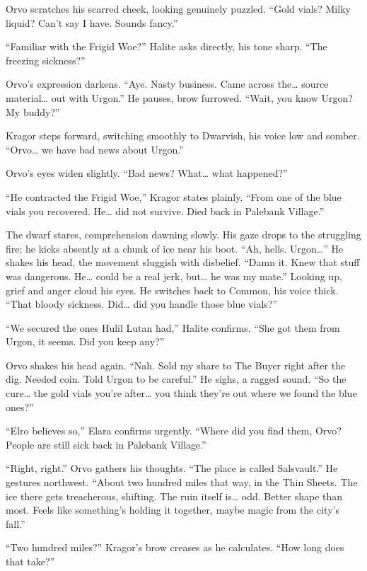 \documentclass[
  letterpaper,12pt,twoside,twocolumn,openany,
  nodeprecatedcode,bg=full]{dndbook}
\begin{document}
Orvo scratches his scarred cheek, looking genuinely puzzled. ``Gold
vials? Milky liquid? Can't say I have. Sounds fancy.''

``Familiar with the Frigid Woe?'' Halite asks directly, his tone sharp.
``The freezing sickness?''

Orvo's expression darkens. ``Aye. Nasty business. Came across
the\ldots{} source material\ldots{} out with Urgon.'' He pauses, brow
furrowed. ``Wait, you know Urgon? My buddy?''

Kragor steps forward, switching smoothly to Dwarvish, his voice low and
somber. ``Orvo\ldots{} we have bad news about Urgon.''

Orvo's eyes widen slightly. ``Bad news? What\ldots{} what happened?''

``He contracted the Frigid Woe,'' Kragor states plainly. ``From one of
the blue vials you recovered. He\ldots{} did not survive. Died back in
Palebank Village.''

The dwarf stares, comprehension dawning slowly. His gaze drops to the
struggling fire; he kicks absently at a chunk of ice near his boot.
``Ah, hells. Urgon\ldots{}'' He shakes his head, the movement sluggish
with disbelief. ``Damn it. Knew that stuff was dangerous. He\ldots{}
could be a real jerk, but\ldots{} he was my mate.'' Looking up, grief
and anger cloud his eyes. He switches back to Common, his voice thick.
``That bloody sickness. Did\ldots{} did you handle those blue vials?''

``We secured the ones Hulil Lutan had,'' Halite confirms. ``She got them
from Urgon, it seems. Did you keep any?''

Orvo shakes his head again. ``Nah. Sold my share to The Buyer right
after the dig. Needed coin. Told Urgon to be careful.'' He sighs, a
ragged sound. ``So the cure\ldots{} the gold vials you're after\ldots{}
you think they're out where we found the blue ones?''

``Elro believes so,'' Elara confirms urgently. ``Where did you find
them, Orvo? People are still sick back in Palebank Village.''

``Right, right.'' Orvo gathers his thoughts. ``The place is called
Salsvault.'' He gestures northwest. ``About two hundred miles that way,
in the Thin Sheets. The ice there gets treacherous, shifting. The ruin
itself is\ldots{} odd. Better shape than most. Feels like something's
holding it together, maybe magic from the city's fall.''

``Two hundred miles?'' Kragor's brow creases as he calculates. ``How
long does that take?''
\end{document}
